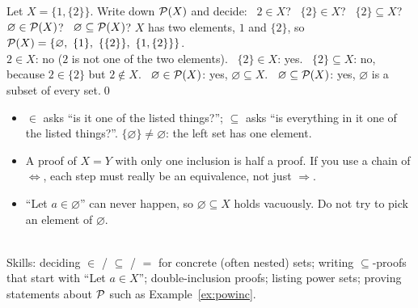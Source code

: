 \begin{hexample}
Let $X=\{1,\{2\}\}$. Write down $\mathcal{P}(X)$ and decide: \ $2\in X$? \ $\{2\}\in X$? \ $\{2\}\subseteq X$? \ $\varnothing\in\mathcal{P}(X)$? \ $\varnothing\subseteq\mathcal{P}(X)$?
\solution
$X$ has two elements, $1$ and $\{2\}$, so $\PS(X)=\{\varnothing,\ \{1\},\ \{\{2\}\},\ \{1,\{2\}\}\}$.\\
$2\in X$: no ($2$ is not one of the two elements). \ $\{2\}\in X$: yes. \ $\{2\}\subseteq X$: no, because $2\in\{2\}$ but $2\notin X$. \ $\varnothing\in\mathcal{P}(X)$: yes, $\varnothing\subseteq X$. \ $\varnothing\subseteq\mathcal{P}(X)$: yes, $\varnothing$ is a subset of every set.\qed
\end{hexample}

\begin{warn}
\begin{itemize}
\item $\in$ asks ``is it one of the listed things?''; $\subseteq$ asks ``is everything in it one of the listed things?''. $\{\varnothing\}\neq\varnothing$: the left set has one element.
\item A proof of $X=Y$ with only one inclusion is half a proof. If you use a chain of $\Leftrightarrow$, each step must really be an equivalence, not just $\Rightarrow$.
\item ``Let $a\in\varnothing$'' can never happen, so $\varnothing\subseteq X$ holds vacuously. Do not try to pick an element of $\varnothing$.
\end{itemize}
\end{warn}

\begin{planning}[2.1]
\quad {}\\[3pt]
Skills: deciding $\in$ / $\subseteq$ / $=$ for concrete (often nested) sets; writing $\subseteq$-proofs that start with ``Let $a\in X$''; double-inclusion proofs; listing power sets; proving statements about $\mathcal{P}$ such as Example~\ref{ex:powinc}.
\end{planning}


